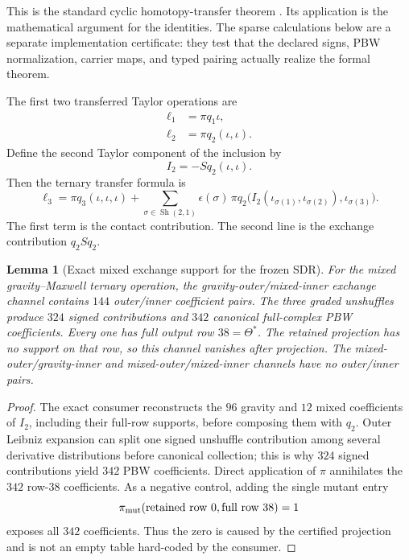 \documentclass[11pt]{article}
\newtheorem{lemma}[theorem]{Lemma}
\theoremstyle{definition}
\theoremstyle{remark}
\begin{document}
This is the standard cyclic homotopy-transfer theorem
\cite{Kajiura,HomotopyTransfer}.  Its application is the mathematical
argument for the identities.  The sparse calculations below are a separate
implementation certificate: they test that the declared signs, PBW
normalization, carrier maps, and typed pairing actually realize the formal
theorem.

The first two transferred Taylor operations are
\begin{align}
 \ell_1&=\pi q_1\iota,\label{eq:ell1}\\
 \ell_2&=\pi q_2(\iota,\iota).\label{eq:ell2}
\end{align}
Define the second Taylor component of the inclusion by
\begin{equation}\label{eq:I2}
 I_2=-S q_2(\iota,\iota).
\end{equation}
Then the ternary transfer formula is
\begin{equation}\label{eq:ell3}
 \ell_3
 =\pi q_3(\iota,\iota,\iota)
 +\sum_{\sigma\in\operatorname{Sh}(2,1)}
   \epsilon(\sigma)\,
   \pi q_2\bigl(I_2(\iota_{\sigma(1)},\iota_{\sigma(2)}),
                     \iota_{\sigma(3)}\bigr).
\end{equation}
The first term is the contact contribution.  The second line is the exchange
contribution $q_2Sq_2$.

\begin{lemma}[Exact mixed exchange support for the frozen SDR]
\label{lem:exchange}
For the mixed gravity--Maxwell ternary operation, the
gravity-outer/mixed-inner exchange channel contains $144$ outer/inner
coefficient pairs.  The three graded unshuffles produce $324$ signed
contributions and $342$ canonical full-complex PBW coefficients.  Every one
has full output row $38=\Theta^*$.  The retained projection has no support on
that row, so this channel vanishes after projection.  The
mixed-outer/gravity-inner and mixed-outer/mixed-inner channels have no
outer/inner pairs.
\end{lemma}

\begin{proof}
The exact consumer reconstructs the $96$ gravity and $12$ mixed coefficients
of $I_2$, including their full-row supports, before composing them with
$q_2$.  Outer Leibniz expansion can split one signed unshuffle contribution
among several derivative distributions before canonical collection; this is
why $324$ signed contributions yield $342$ PBW coefficients.  Direct
application of $\pi$ annihilates the $342$ row-$38$ coefficients.  As a
negative control,
adding the single mutant entry
\begin{equation}
 \pi_{\rm mut}(\text{retained row }0,\text{full row }38)=1
\end{equation}
exposes all $342$ coefficients.  Thus the zero is caused by the certified
projection and is not an empty table hard-coded by the consumer.
\end{proof}
\end{document}
